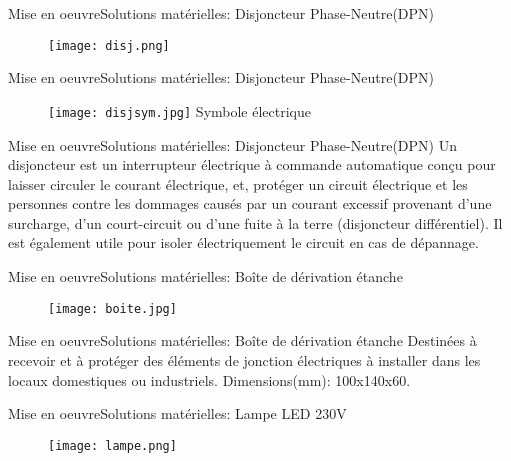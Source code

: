 \documentclass{beamer}
\begin{document}
	
	\begin{frame}{Mise en oeuvre}{Solutions matérielles: Disjoncteur Phase-Neutre(DPN)}
		\begin{figure}\centering
			\texttt{[image: disj.png]}
		\end{figure}	
	\end{frame}
	\begin{frame}{Mise en oeuvre}{Solutions matérielles: Disjoncteur Phase-Neutre(DPN)}
		\begin{figure}\centering
			\texttt{[image: disjsym.jpg]}
			{Symbole électrique}
		\end{figure}	
	\end{frame}
	
	\begin{frame}{Mise en oeuvre}{Solutions matérielles: Disjoncteur Phase-Neutre(DPN)}
		Un disjoncteur est un interrupteur électrique à commande automatique conçu pour laisser circuler le courant électrique, et, protéger un circuit électrique et les personnes contre les dommages causés par un courant excessif provenant d'une surcharge, d'un court-circuit ou d'une fuite à la terre (disjoncteur différentiel). Il est également utile pour isoler électriquement le circuit en cas de dépannage.
	\end{frame}
	
	\begin{frame}{Mise en oeuvre}{Solutions matérielles: Boîte de dérivation étanche}
		\begin{figure}\centering
			\texttt{[image: boite.jpg]}
		\end{figure}	
	\end{frame}
	
	\begin{frame}{Mise en oeuvre}{Solutions matérielles: Boîte de dérivation étanche}
		Destinées à recevoir et à protéger des éléments de jonction électriques à installer dans les locaux domestiques ou industriels. Dimensions(mm): 100x140x60.
	\end{frame}
	
	\begin{frame}{Mise en oeuvre}{Solutions matérielles: Lampe LED 230V}
		\begin{figure}\centering
			\texttt{[image: lampe.png]}
		\end{figure}
		
	\end{frame}
	
\end{document}
